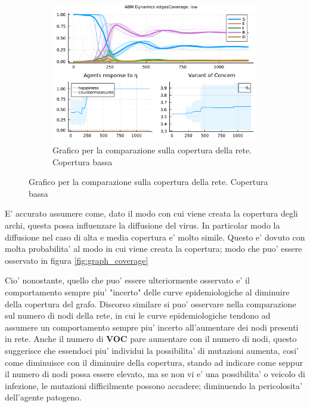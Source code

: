 \begin{figure}[!hb]
\begin{subfigure}[b]{0.3\textwidth}
		\includegraphics[width=\textwidth]{img/SocialNetworkABM_3_EC.pdf}
		\caption{Grafico per la comparazione sulla copertura della rete. Copertura bassa}
		\label{fig:comparison_lowCoverage}
	\end{subfigure}
\end{figure}

E' accurato assumere come, dato il modo con cui viene creata la copertura degli archi, questa 
possa influenzare la diffusione del virus. In particolar modo la diffusione nel caso di alta e media copertura 
e' molto simile. Questo e' dovuto con molta probabilita' al modo in cui viene creata la copertura; modo che 
puo' essere osservato in figura \ref{fig:graph_coverage}

Cio' nonostante, quello che puo' essere ulteriormente osservato e' il comportamento sempre piu' "incerto" delle curve 
epidemiologiche al diminuire della copertura del grafo. Discorso similare si puo' osservare nella comparazione sul numero 
di nodi della rete, in cui le curve epidemiologiche tendono ad assumere un comportamento sempre piu' incerto all'aumentare dei 
nodi presenti in rete. Anche il numero di \textbf{VOC} pare aumentare con il numero di nodi, questo suggerisce che essendoci 
piu' individui la possibilita' di mutazioni aumenta, cosi' come diminuisce con il diminuire della copertura, stando ad indicare 
come seppur il numero di nodi possa essere elevato, ma se non vi e' una possibilita' o veicolo di infezione, le mutazioni difficilmente
possono accadere; diminuendo la pericolosita' dell'agente patogeno.

